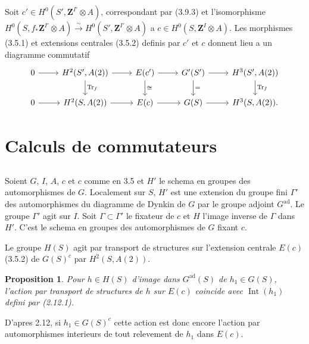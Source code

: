 \documentclass[11pt,a4paper]{article}
\theoremstyle{plain}
\newtheorem{proposition}[theorem]{Proposition}
\theoremstyle{definition}
\DeclareMathOperator{\ad}{ad}
\DeclareMathOperator{\Int}{Int}
\DeclareMathOperator{\Tr}{Tr}
\begin{document}
Soit $c' \in H^0(S', \mathbf{Z}^{I'} \otimes A)$, correspondant par (3.9.3) et l'isomorphisme $H^0(S, f_* \mathbf{Z}^{I'} \otimes A) \xrightarrow{\sim} H^0(S', \mathbf{Z}^{I'} \otimes A)$ a $c \in H^0(S, \mathbf{Z}^I \otimes A)$. Les morphismes (3.5.1) et extensions centrales (3.5.2) definis par $c'$ et $c$ donnent lieu a un diagramme commutatif
\begin{equation}\label{3.9.4}
\begin{tikzcd}
0 \arrow{r} & H^2(S', A(2)) \arrow{r} \arrow{d}{\Tr_f} & E(c') \arrow{r} \arrow{d}{\cong} & G'(S') \arrow{r} \arrow{d}{=} & H^3(S', A(2)) \arrow{d}{\Tr_f} \\
0 \arrow{r} & H^2(S, A(2)) \arrow{r} & E(c) \arrow{r} & G(S) \arrow{r} & H^3(S, A(2)).
\end{tikzcd}
\end{equation}

\section{Calculs de commutateurs}

\subsection{}\label{4.1}

Soient $G$, $I$, $A$, $c$ et $c$ comme en 3.5 et $H'$ le schema en groupes des automorphismes de $G$. Localement sur $S$, $H'$ est une extension du groupe fini $\Gamma'$ des automorphismes du diagramme de Dynkin de $G$ par le groupe adjoint $G^{\ad}$. Le groupe $\Gamma'$ agit sur $I$. Soit $\Gamma \subset \Gamma'$ le fixateur de $c$ et $H$ l'image inverse de $\Gamma$ dans $H'$. C'est le schema en groupes des automorphismes de $G$ fixant $c$.

Le groupe $H(S)$ agit par transport de structures sur l'extension centrale $E(c)$ (3.5.2) de $G(S)^c$ par $H^2(S, A(2))$.

\begin{proposition}\label{4.2}
Pour $h \in H(S)$ d'image dans $G^{\ad}(S)$ de $h_1 \in G(S)$, l'action par transport de structures de $h$ sur $E(c)$ coincide avec $\Int(h_1)$ defini par (2.12.1).
\end{proposition}

D'apres 2.12, si $h_1 \in G(S)^c$ cette action est donc encore l'action par automorphismes interieurs de tout relevement de $h_1$ dans $E(c)$.
\end{document}
